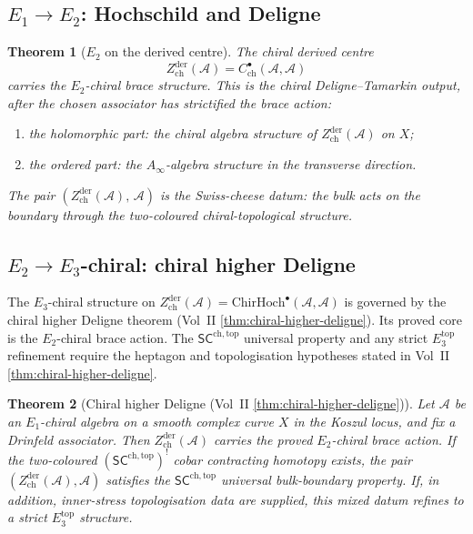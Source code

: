 \documentclass[11pt]{article}
\newtheorem{theorem}{Theorem}[section]
\theoremstyle{remark}
\providecommand{\cA}{\mathcal{A}}
\providecommand{\ChirHoch}{\mathrm{ChirHoch}}
\providecommand{\Ainf}{A_\infty}
\providecommand{\SCchtop}{\mathsf{SC}^{\mathrm{ch},\mathrm{top}}}
\begin{document}
\subsection*{$E_1 \to E_2$: Hochschild and Deligne}

\begin{theorem}[$E_2$ on the derived centre]\label{thm:e2}
The chiral derived centre
\[
Z^{\mathrm{der}}_{\mathrm{ch}}(\cA) = C^\bullet_{\mathrm{ch}}(\cA,\cA)
\]
carries the $E_2$-chiral brace structure.  This is the chiral
Deligne--Tamarkin output, after the chosen associator has strictified
the brace action:
\begin{enumerate}[label=\textup{(\alph*)}]
\item the holomorphic part: the chiral algebra structure of
  $Z^{\mathrm{der}}_{\mathrm{ch}}(\cA)$ on $X$;
\item the ordered part: the $\Ainf$-algebra structure in the
  transverse direction.
\end{enumerate}
The pair $(Z^{\mathrm{der}}_{\mathrm{ch}}(\cA),\, \cA)$ is the
Swiss-cheese datum: the bulk acts on the boundary through the
two-coloured chiral-topological structure.
\end{theorem}

\subsection*{$E_2 \to E_3$-chiral: chiral higher Deligne}

The $E_3$-chiral structure on
$Z^{\mathrm{der}}_{\mathrm{ch}}(\cA) = \ChirHoch^\bullet(\cA, \cA)$
is governed by the chiral higher Deligne theorem
(Vol~II \ref*{thm:chiral-higher-deligne}).  Its proved core is the
$E_2$-chiral brace action.  The $\SCchtop$ universal property and any
strict $E_3^{\mathrm{top}}$ refinement require the heptagon and
topologisation hypotheses stated in Vol~II
\ref*{thm:chiral-higher-deligne}.

\begin{theorem}[Chiral higher Deligne (Vol~II
\ref*{thm:chiral-higher-deligne})]%
\label{thm:chiral-higher-deligne-standalone}%
Let $\cA$ be an $E_1$-chiral algebra on a smooth complex curve $X$ in
the Koszul locus, and fix a Drinfeld associator. Then
$Z^{\mathrm{der}}_{\mathrm{ch}}(\cA)$ carries the proved $E_2$-chiral
brace action.  If the two-coloured $(\SCchtop)^!$ cobar contracting
homotopy exists, the pair
$(Z^{\mathrm{der}}_{\mathrm{ch}}(\cA),\cA)$ satisfies the
$\SCchtop$ universal bulk-boundary property.  If, in addition,
inner-stress topologisation data are supplied, this mixed datum refines
to a strict $E_3^{\mathrm{top}}$ structure.
\end{theorem}
\end{document}
